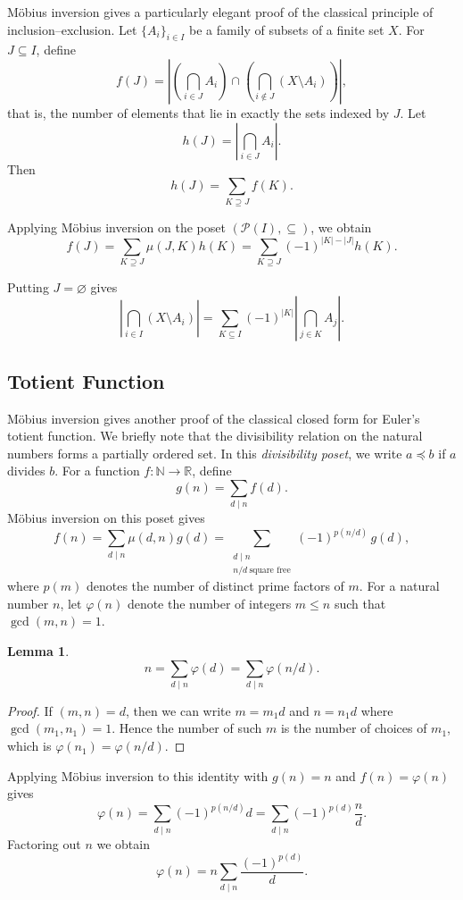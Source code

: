 \documentclass{amsart}
\numberwithin{equation}{section}
\theoremstyle{plain}
\newtheorem{lemma}[theorem]{Lemma}
\theoremstyle{definition}
\begin{document}
M\"obius inversion gives a particularly elegant proof of the classical
principle of inclusion--exclusion. Let $\{A_i\}_{i\in I}$ be a family of subsets of a finite set $X$.
For $J\subseteq I$, define
\[
f(J)=\left|\left(\bigcap_{i\in J}A_i\right)\cap
\left(\bigcap_{i\notin J}(X\setminus A_i)\right)\right|,
\]
that is, the number of elements that lie in exactly the sets indexed by $J$.
Let
\[
h(J)=\left|\bigcap_{i\in J}A_i\right|.
\]
Then
\[
h(J)=\sum_{K\supseteq J} f(K).
\]

Applying M\"obius inversion on the poset $(\mathcal{P}(I),\subseteq)$, we obtain
\[
f(J)=\sum_{K\supseteq J}\mu(J,K)h(K)
     =\sum_{K\supseteq J}(-1)^{|K|-|J|}h(K).
\]

Putting $J=\varnothing$ gives
\[
\left|\bigcap_{i\in I}(X\setminus A_i)\right|
=
\sum_{K\subseteq I}(-1)^{|K|}
\left|\bigcap_{j\in K}A_j\right|.
\]


\subsection{Totient Function}

M\"obius inversion gives another proof of the classical closed form
for Euler's totient function. We briefly note that the divisibility relation on the natural numbers
forms a partially ordered set. In this \emph{divisibility poset}, we write
$a \preceq b$ if $a$ divides $b$. For a function $f:\mathbb{N}\to\mathbb{R}$,
define
\[
g(n)=\sum_{d\mid n} f(d).
\]
M\"obius inversion on this poset gives
\[
f(n)=\sum_{d\mid n}\mu(d,n)g(d)
   =\sum_{\substack{d\mid n\\ n/d\ \text{square free}}}
     (-1)^{p(n/d)}\,g(d),
\]
where $p(m)$ denotes the number of distinct prime factors of $m$. For a natural number $n$, let $\varphi(n)$ denote the number of integers
$m\le n$ such that $\gcd(m,n)=1$.

\begin{lemma}
\[
n=\sum_{d\mid n}\varphi(d)=\sum_{d\mid n}\varphi(n/d).
\]
\end{lemma}

\begin{proof}
If $(m,n)=d$, then we can write $m=m_1d$ and $n=n_1d$ where
$\gcd(m_1,n_1)=1$. Hence the number of such $m$ is the number
of choices of $m_1$, which is $\varphi(n_1)=\varphi(n/d)$.
\end{proof}

Applying M\"obius inversion to this identity with $g(n)=n$
and $f(n)=\varphi(n)$ gives
\[
\varphi(n)=\sum_{d\mid n}(-1)^{p(n/d)}d
         =\sum_{d\mid n}(-1)^{p(d)}\frac{n}{d}.
\]
Factoring out $n$ we obtain
\[
\varphi(n)=n\sum_{d\mid n}\frac{(-1)^{p(d)}}{d}.
\]
\end{document}
